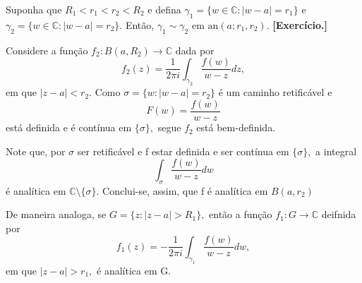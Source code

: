 \documentclass[complex.tex]{subfiles}
\begin{document}
\begin{proof*}
	Suponha que \(R_{1} < r_{1} < r_{2} < R_{2}\) e defina \(\gamma_{1} = \{w \in \mathbb{C}:|w -a| = r_{1}\}\) e \(\gamma_{2} = \{w \in \mathbb{C}:|w -a|=r_{2}\}\).
	Então, \(\gamma_{1}\sim \gamma _{2}\) em \(\mathrm{an}(a; r_{1}, r_{2})\). \textbf{[Exercício.]}

	Considere a função \(f_{2}:B(a, R_{2})\rightarrow \mathbb{C}\) dada por
	\[
		f_{2}(z) = \frac{1}{2\pi i} \int_{\gamma_{2}}^{}\frac{f(w)}{w-z}dz,
	\]
	em que \(|z-a| < r_{2}.\) Como \(\sigma = \{w: |w - a| = r_{2}\}\) é um caminho retificável e
	\[
		F(w) = \frac{f(w)}{w-z}
	\]
	está definida e é contínua em \(\{\sigma \},\) segue \(f_{2}\) está bem-definida.

	Note que, por \(\sigma \) ser retificável e f estar definida e ser contínua em \(\{\sigma \},\) a integral
	\[
		\int_{\sigma }^{}\frac{f(w)}{w-z}dw
	\]
	é analítica em \(\mathbb{C}\setminus{\{\sigma \}}\). Conclui-se, assim, que f é analítica em \(B(a, r_{2})\)

	De maneira analoga, se \(G = \{z: |z-a| > R_{1}\},\) então a função \(f_{1}:G\rightarrow \mathbb{C}\) deifnida por
	\[
		f_{1}(z) = -\frac{1}{2\pi i}\int_{\gamma_{1}}^{}\frac{f(w)}{w-z}dw,
	\]
	em que \(|z-a| > r_{1},\) é analítica em G.


\end{proof*}
\end{document}
